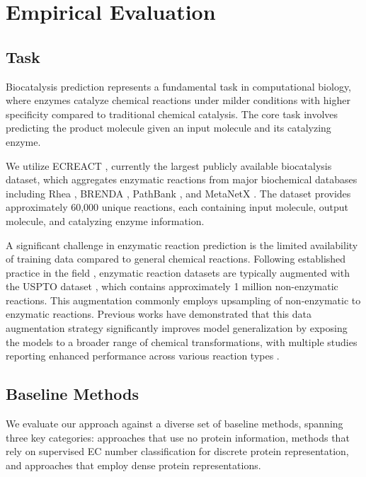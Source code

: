 \documentclass[sigconf]{acmart}
\begin{document}
\section{Empirical Evaluation}
\subsection{Task}
Biocatalysis prediction represents a fundamental task in computational biology, where enzymes catalyze chemical reactions under milder conditions with higher specificity compared to traditional chemical catalysis. The core task involves predicting the product molecule given an input molecule and its catalyzing enzyme.

We utilize ECREACT \cite{Probst2022}, currently the largest publicly available biocatalysis dataset, which aggregates enzymatic reactions from major biochemical databases including Rhea \cite{bansal2022rhea}, BRENDA \cite{placzek2016brenda}, PathBank \cite{wishart2020pathbank}, and MetaNetX \cite{ganter2013metanetx}. The dataset provides approximately 60,000 unique reactions, each containing input molecule, output molecule, and catalyzing enzyme information.

A significant challenge in enzymatic reaction prediction is the limited availability of training data compared to general chemical reactions. Following established practice in the field \cite{Probst2022,Chen2023,kreutter2021predicting,goshisht2024machine}, enzymatic reaction datasets are typically augmented with the USPTO dataset \cite{marco2015uspto}, which contains approximately 1 million non-enzymatic reactions. This augmentation commonly employs upsampling of non-enzymatic to enzymatic reactions. Previous works have demonstrated that this data augmentation strategy significantly improves model generalization by exposing the models to a broader range of chemical transformations, with multiple studies reporting enhanced performance across various reaction types \cite{Probst2022,Chen2023}.

\subsection{Baseline Methods}

We evaluate our approach against a diverse set of baseline methods, spanning three key categories: approaches that use no protein information, methods that rely on supervised EC number classification for discrete protein representation, and approaches that employ dense protein representations.
\end{document}

